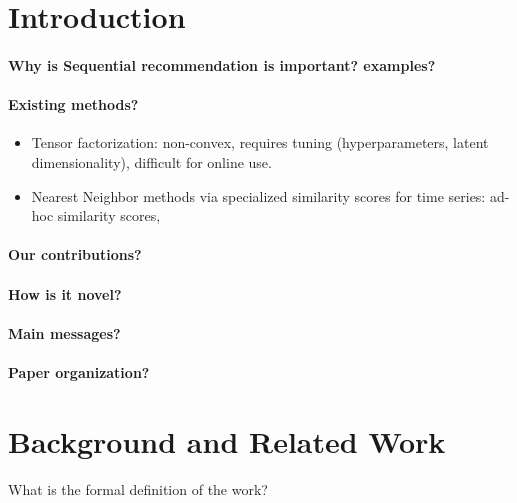 \documentclass{sig-alternate-05-2015}
\begin{document}
%
%

%
%
\printccsdesc



\section{Introduction}
\paragraph{Why is Sequential recommendation is important? examples?}


\paragraph{Existing methods?} 
\begin{itemize}
\item Tensor factorization: non-convex, requires tuning (hyperparameters, latent dimensionality), difficult for online use.
\item Nearest Neighbor methods via specialized similarity scores for time series: ad-hoc similarity scores, 
\end{itemize}

\paragraph{Our contributions?}


\paragraph{How is it novel?} 

\paragraph{Main messages?}

\paragraph{Paper organization?}


\section{Background and Related Work}
What is the formal definition of the work?
\end{document}
